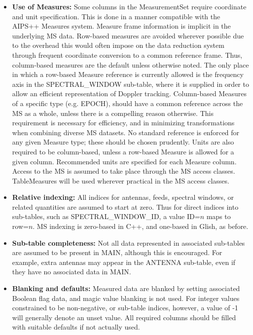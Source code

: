 \documentclass{article}
\begin{document}
\begin{itemize}
\item{{\bf Use of Measures:} Some columns in the MeasurementSet
require coordinate and unit specification. This is done in a manner
compatible with the AIPS++ Measures system. Measure frame information
is implicit in the underlying MS data. Row-based measures are avoided
wherever possible due to the overhead this would often impose on the
data reduction system through frequent coordinate conversion to a
common reference frame. Thus, column-based measures are the default
unless otherwise noted. The only place in which a row-based Measure
reference is currently allowed is the frequency axis in the
SPECTRAL\_WINDOW sub-table, where it is supplied in order to allow an
efficient representation of Doppler tracking. Column-based Measures of
a specific type (e.g. EPOCH), should have a common reference across
the MS as a whole, unless there is a compelling reason otherwise. This
requirement is necessary for efficiency, and in minimizing
transformations when combining diverse MS datasets. No standard
reference is enforced for any given Measure type; these should be
chosen prudently. Units are also required to be column-based, unless a
row-based Measure is allowed for a given column. Recommended units are
specified for each Measure column. Access to the MS is assumed to take
place through the MS access classes. TableMeasures will be used
wherever practical in the MS access classes.}

\item{{\bf Relative indexing:} All indices for antennas, feeds,
spectral windows, or related quantities are assumed to start at zero.
Thus for direct indices into sub-tables, such as SPECTRAL\_WINDOW\_ID,
a value ID=$n$ maps to row=$n$. MS indexing is zero-based in C++, and
one-based in Glish, as before.}

\item{{\bf Sub-table completeness:} Not all data represented in
associated sub-tables are assumed to be present in MAIN, although this
is encouraged. For example, extra antennas may appear in the ANTENNA
sub-table, even if they have no associated data in MAIN.}

\item{{\bf Blanking and defaults:} Measured data are blanked by
setting associated Boolean flag data, and magic value blanking is not
used. For integer values constrained to be non-negative, or sub-table
indices, however, a value of -1 will generally denote an unset
value. All required columns should be filled with suitable defaults if
not actually used.}


\end{itemize}
\end{document}
